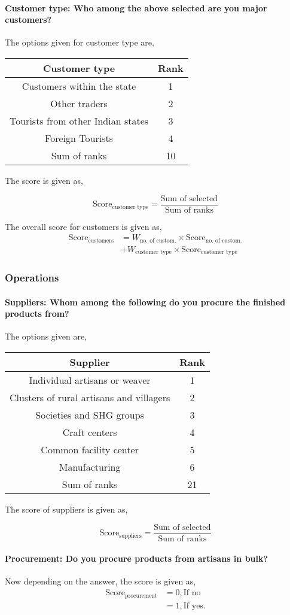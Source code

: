 \documentclass[oneside,twocolumn]{article}
\newcommand{\tsub}[2]{\text{#1}_{\text{#2}}}
\newcommand{\tsubb}[2]{#1_{\text{#2}}}
\newcommand{\dsub}[2]{\dfrac{\text{#1}}{\text{#2}}}
\newcommand{\multsel}[1]
{
	\[
		\tsub{Score}{#1} = \dsub{Sum of selected}{Sum of ranks}
	\]
}
\newenvironment{ttable}
{
\begin{center}
\begin{tabular}{c|c}
\hline
}
{
\\ \hline
\end{tabular}
\end{center}
}
\begin{document}
\paragraph{Customer type: Who among the above selected are you major customers?}
The options given for customer type are,
\begin{ttable}
	Customer type & Rank \\ \hline
	Customers within the state & 1 \\
	Other traders & 2 \\
	Tourists from other Indian states & 3 \\
	Foreign Tourists & 4 \\ \hline
	Sum of ranks & 10
\end{ttable}
The score is given as,
\multsel{customer type}

The overall score for customers is given as,
\begin{align*}
	\tsub{Score}{customers} &= \tsubb{W}{no. of custom.} \times \tsub{Score}{no. of custom.} \\
	&+ \tsubb{W}{customer type} \times \tsub{Score}{customer type}
\end{align*}
\subsubsection{Operations}
\paragraph{Suppliers: Whom among the following do you procure the finished products from?}
The options given are,
\begin{ttable}
	Supplier & Rank \\ \hline
	Individual artisans or weaver & 1 \\
	Clusters of rural artisans and villagers & 2 \\
	Societies and SHG groups & 3 \\
	Craft centers & 4 \\
	Common facility center & 5 \\
	Manufacturing & 6 \\ \hline
	Sum of ranks & 21
\end{ttable}
The score of suppliers is given as,
\multsel{suppliers}
\paragraph{Procurement: Do you procure products from artisans in bulk?}
Now depending on the answer, the score is given as,
\begin{align*}
	\tsub{Score}{procurement} &= 0, \text{If no} \\
	&= 1, \text{If yes}.
\end{align*}
\end{document}
